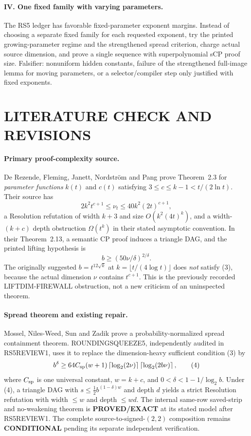 \documentclass[11pt]{article}
\newcommand{\EXACT}{\textbf{PROVED/EXACT}}
\newcommand{\COND}{\textbf{CONDITIONAL}}
\begin{document}
\paragraph{IV. One fixed family with varying parameters.}
The RS5 ledger has favorable fixed-parameter exponent margins.
Instead of choosing a separate fixed family for each requested exponent,
try the printed growing-parameter regime and the strengthened spread
criterion, charge actual source dimension, and prove a single sequence
with superpolynomial sCP proof size. Falsifier: nonuniform hidden constants,
failure of the strengthened full-image lemma for moving parameters, or a
selector/compiler step only justified with fixed exponents.

\section{LITERATURE CHECK AND REVISIONS}
\paragraph{Primary proof-complexity source.}
De Rezende, Fleming, Janett, Nordstr\"om and Pang \cite{deRezende} prove
Theorem~2.3 for \emph{parameter functions} $k(t)$ and $c(t)$ satisfying
$3\le c\le k-1<t/(2\ln t)$. Their source has
\[
2k^2t^{c+1}\le \nu_t\le40k^2(2t)^{c+1},                  \tag{2}
\]
a Resolution refutation of width $k+3$ and size
$O(k^2(4t)^k)$, and a width-$(k+c)$ depth obstruction
$\Omega(t^k)$ in their stated asymptotic convention.
In their Theorem~2.13, a semantic CP proof induces a triangle DAG, and
the printed lifting hypothesis is
\[
b\ge(50\nu/\delta)^{2/\delta}.                          \tag{3}
\]
The originally suggested $b=t^{12\sqrt{k}}$ at
$k=\lfloor t/(4\log t)\rfloor$ does \emph{not} satisfy (3),
because the actual dimension $\nu$ contains $t^{c+1}$.
This is the previously recorded LIFTDIM-FIREWALL obstruction,
not a new criticism of an uninspected theorem.

\paragraph{Spread theorem and existing repair.}
Mossel, Niles-Weed, Sun and Zadik \cite{spread} prove a
probability-normalized spread containment theorem.
ROUNDINGSQUEEZE5, independently audited in RS5REVIEW1, uses it to replace
the dimension-heavy sufficient condition (3) by
\[
 b^\delta\ge 64C_{\rm sp}(w+1)
  \left\lceil\log_2(2\nu)\right\rceil
  \left\lceil\log_2(2b\nu)\right\rceil,                \tag{4}
\]
where $C_{\rm sp}$ is one universal constant, $w=k+c$, and
$0<\delta<1-1/\log_2 b$.
Under (4), a triangle DAG with
$s\le \tfrac12b^{(1-\delta)w}$ and depth $d$
yields a strict Resolution refutation with width $\le w$
and depth $\le wd$. The internal same-row saved-strip and
no-weakening theorem is \EXACT{} at its stated model after RS5REVIEW1.
The complete source-to-signed-$(2,2)$ composition remains \COND{}
pending its separate independent verification.
\end{document}
